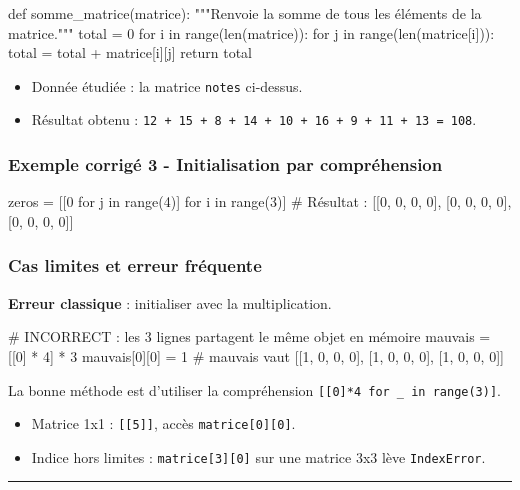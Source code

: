 \begin{python}
def somme_matrice(matrice):
    """Renvoie la somme de tous les éléments de la matrice."""
    total = 0
    for i in range(len(matrice)):
        for j in range(len(matrice[i])):
            total = total + matrice[i][j]
    return total
\end{python}

\begin{itemize}
\tightlist
\item
  Donnée étudiée : la matrice \texttt{notes} ci-dessus.
\item
  Résultat obtenu :
  \texttt{12\ +\ 15\ +\ 8\ +\ 14\ +\ 10\ +\ 16\ +\ 9\ +\ 11\ +\ 13\ =\ 108}.
\end{itemize}

\subsubsection{Exemple corrigé 3 - Initialisation par compréhension}

\begin{python}
zeros = [[0 for j in range(4)] for i in range(3)]
# Résultat : [[0, 0, 0, 0], [0, 0, 0, 0], [0, 0, 0, 0]]
\end{python}

\subsubsection{Cas limites et erreur fréquente}

\textbf{Erreur classique} : initialiser avec la multiplication.

\begin{python}
# INCORRECT : les 3 lignes partagent le même objet en mémoire
mauvais = [[0] * 4] * 3
mauvais[0][0] = 1
# mauvais vaut [[1, 0, 0, 0], [1, 0, 0, 0], [1, 0, 0, 0]]
\end{python}

La bonne méthode est d'utiliser la compréhension
\texttt{{[}{[}0{]}*4\ for\ \_\ in\ range(3){]}}.

\begin{itemize}
\tightlist
\item
  Matrice 1x1 : \texttt{{[}{[}5{]}{]}}, accès
  \texttt{matrice{[}0{]}{[}0{]}}.
\item
  Indice hors limites : \texttt{matrice{[}3{]}{[}0{]}} sur une matrice
  3x3 lève \texttt{IndexError}.
\end{itemize}

\begin{center}\rule{0.5\linewidth}{0.5pt}\end{center}

